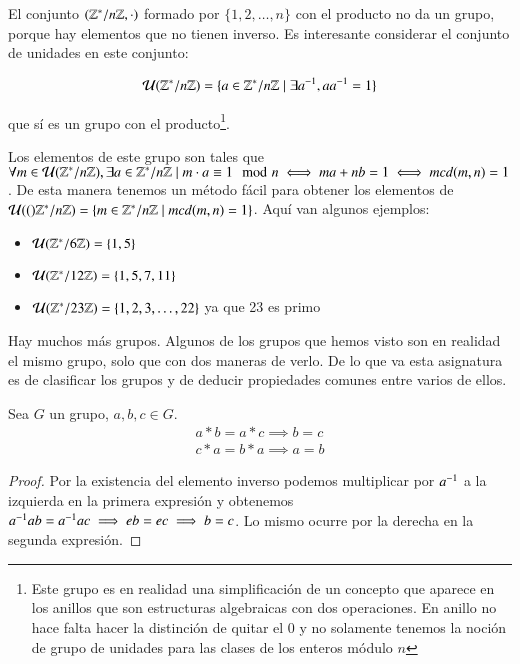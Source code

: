 \begin{ej}
	\label{ej:grupounidades}
	El conjunto $(\mathbb{Z}^*/n\mathbb{Z}, \cdot)$ formado por $\{1, 2, \dots, n\}$ con el producto no da un grupo, porque hay elementos que no tienen inverso. Es interesante considerar el conjunto de unidades en este conjunto:
	
	\begin{align*}
	\mathcal{U}(\mathbb{Z}^*/n\mathbb{Z}) = \{a \in \mathbb{Z}^*/n\mathbb{Z} \mid \exists a^{-1}, a a^{-1} = 1\}
	\end{align*}
	
	que sí es un grupo con el producto\footnote{Este grupo es en realidad una simplificación de un concepto que aparece en los anillos que son estructuras algebraicas con dos operaciones. En anillo no hace falta hacer la distinción de quitar el 0 y no solamente tenemos la noción de grupo de unidades para las clases de los enteros módulo $n$}.
	
	Los elementos de este grupo son tales que $\forall m \in \mathcal{U}(\mathbb{Z}^\ast / n\mathbb{Z}), \exists a \in \mathbb{Z}^\ast/n\mathbb{Z} \mid m\cdot a \equiv 1 \mod n \iff ma + nb = 1 \iff mcd(m,n) = 1$. De esta manera tenemos un método fácil para obtener los elementos de $\mathcal{U}(()\mathbb{Z}^\ast / n \mathbb{Z}) = \{m \in \mathbb{Z}^\ast/n\mathbb{Z} \mid mcd(m,n) = 1\}$. Aquí van algunos ejemplos:
	\begin{itemize}
		\item $\mathcal{U}(\mathbb{Z}^\ast/6\mathbb{Z}) = \{1, 5\}$
		\item $\mathcal{U}(\mathbb{Z}^\ast/12\mathbb{Z}) = \{1, 5, 7, 11\}$	
		\item $\mathcal{U}(\mathbb{Z}^\ast/23\mathbb{Z}) = \{1, 2, 3,\dots, 22\}$ ya que 23 es primo
	\end{itemize}
\end{ej}

Hay muchos más grupos. Algunos de los grupos que hemos visto son en realidad el mismo grupo, solo que con dos maneras de verlo. De lo que va esta asignatura es de clasificar los grupos y de deducir propiedades comunes entre varios de ellos.

\begin{thm}
	Sea $G$ un grupo, $a, b, c \in G$.
	\begin{align}
		a \ast b = a \ast c \implies b = c \\
		c \ast a = b \ast a \implies a = b
	\end{align}
\end{thm}

\begin{proof}
	Por la existencia del elemento inverso podemos multiplicar por $a^{-1}$ a la izquierda en la primera expresión y obtenemos $a^{-1} a b = a^{-1} a c \implies e b = e c \implies b = c$. Lo mismo ocurre por la derecha en la segunda expresión.
\end{proof}

